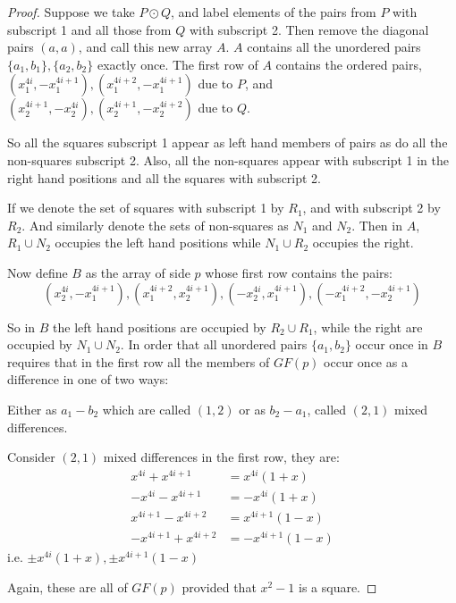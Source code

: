 \begin{proof}
Suppose we take $P \odot Q$, and label elements of the pairs from $P$ with subscript 1 and all those from $Q$ with subscript 2.
Then remove the diagonal pairs $(a, a)$, and call this new array $A$.
$A$ contains all the unordered pairs $\{a_1, b_1\},\{a_2, b_2\}$ exactly once.
The first row of $A$ contains the ordered pairs,
$(x_1^{4i}, -x_1^{4i + 1}), (x_1^{4i + 2}, -x_1^{4i + 1})$
due to $P$, and
$(x_2^{4i + 1}, -x_2^{4i}), (x_2^{4i + 1}, -x_2^{4i  +2})$
due to $Q$.

So all the squares subscript 1 appear as left hand members of pairs as do all the non-squares subscript 2.
Also, all the non-squares appear with subscript 1 in the right hand positions and all the squares with subscript 2.

If we denote the set of squares with subscript 1 by $R_1$, and with subscript 2 by $R_2$.
And similarly denote the sets of non-squares as $N_1$ and $N_2$.
Then in $A$, $R_1 \cup N_2$ occupies the left hand positions while $N_1 \cup R_2$ occupies the right.

Now define $B$ as the array of side $p$ whose first row contains the pairs:
\begin{equation}
(x_2^{4i}, -x_1^{4i + 1}), (x_1^{4i + 2}, x_2^{4i + 1}), (-x_2^{4i}, x_1^{4i + 1}), (-x_1^{4i + 2}, -x_2^{4i + 1})
\end{equation}

So in $B$ the left hand positions are occupied by $R_2 \cup R_1$, while the right are occupied by $N_1 \cup N_2$.
In order that all unordered pairs $\{a_1, b_2\}$ occur once in $B$ requires that in the first row all the members of $GF(p)$ occur once as a difference in one of two ways:

Either as $a_1 - b_2$ which are called $(1, 2)$  or as $b_2 - a_1$, called $(2, 1)$ mixed differences.

Consider $(2, 1)$ mixed differences in the first row, they are:
\begin{align*}
       x^{4i} + x^{4i + 1} &= x^{4i}(1 + x)      \\
      -x^{4i} - x^{4i + 1} &=-x^{4i}(1 + x)      \\
   x^{4i + 1} - x^{4i + 2} &= x^{4i + 1}(1 - x)  \\
  -x^{4i + 1} + x^{4i + 2} &= -x^{4i + 1}(1 - x)
\end{align*}
i.e. $\pm x^{4i}(1 + x), \pm x^{4i + 1}(1 - x)$

Again, these are all of $GF(p)$ provided that $x^2- 1$ is a square.


\end{proof}
